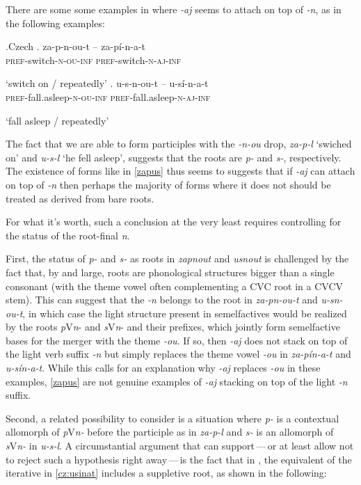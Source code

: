 There are some some examples in  where \textit{-aj} seems to attach on top of \textit{-n}, as in the following examples:

\ex.Czech\label{zapus}
\ag. za-p-n-ou-t -- za-p\'i-n-a-t\\
 \textsc{pref}-switch-\textsc{n-ou-inf} {} \textsc{pref}-switch-\textsc{n-aj-inf}\\
 \strut `switch on / repeatedly'
\bg. u-s-n-ou-t -- u-s\'i-n-a-t\\
\textsc{pref}-fall.asleep-\textsc{n-ou-inf} {} \textsc{pref}-fall.asleep-\textsc{n-aj-inf}\\
\strut `fall asleep / repeatedly'\label{cz:usinat}

The fact that we are able to form participles with the \textit{-n-ou} drop, \textit{za-p-l} `swiched on' and \textit{u-s-l} `he fell asleep', suggests that the roots are \textit{p-} and \textit{s-}, respectively. The existence of forms like in \ref{zapus} thus seems to suggests that if \textit{-aj} can attach on top of \textit{-n} then perhaps the majority of forms where it does not should be treated as derived from bare roots.
\par
For what it's worth, such a conclusion at the very least requires controlling for the status of the root-final \textit{n}.
\par
First, the status of \textit{p-} and \textit{s-} as roots in \textit{zapnout} and \textit{usnout} is challenged by the fact that, by and large,  roots are phonological structures bigger than a single consonant (with the theme vowel  often complementing a CVC root in a CVCV stem). This can suggest that the \textit{-n} belongs to the root in \textit{za-pn-ou-t} and \textit{u-sn-ou-t}, in which case the light  structure present in  semelfactives would be realized by the roots \textit{p}V\textit{n}- and \textit{s}V\textit{n}- and their prefixes, which jointly form semelfactive bases for the merger with the theme \textit{-ou}. If so, then \textit{-aj} does not stack on top of the light verb suffix \textit{-n} but simply replaces the theme vowel \textit{-ou} in \textit{za-p\'in-a-t} and \textit{u-s\'in-a-t}. While this calls for an explanation why \textit{-aj} replaces \textit{-ou} in these examples, \ref{zapus} are not genuine examples of \textit{-aj} stacking on top of the light \textit{-n} suffix. 
\par
Second, a related possibility to consider is a situation where \textit{p-} is a contextual allomorph  of \textit{p}V\textit{n-} before the participle as in \textit{za-p-l} and \textit{s-} is an allomorph of \textit{s}V\textit{n-} in \textit{u-s-l}. A circumstantial argument that can support\,---\,or at least allow not to reject such a hypothesis right away\,---\,is the fact that in , the equivalent of the  iterative in \ref{cz:usinat} includes a suppletive root, as shown in the following:

